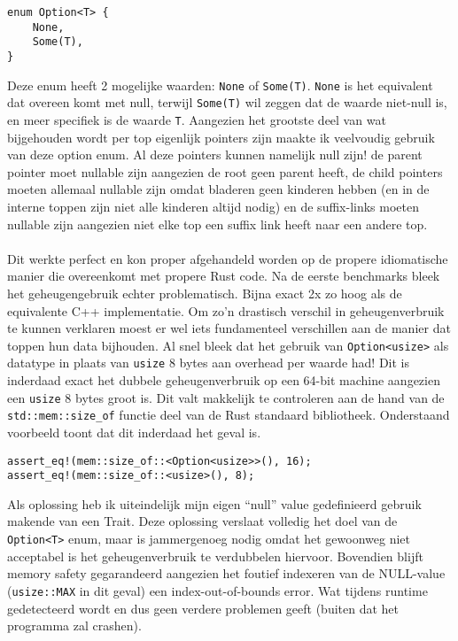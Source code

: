 \begin{verbatim}
enum Option<T> {
    None,
    Some(T),
}
\end{verbatim}

Deze enum heeft 2 mogelijke waarden: \texttt{None} of \texttt{Some(T)}.
\texttt{None} is het equivalent dat overeen komt met null, terwijl \texttt{Some(T)} wil zeggen dat de waarde niet-null is, en meer specifiek is de waarde \texttt{T}.
Aangezien het grootste deel van wat bijgehouden wordt per top eigenlijk pointers zijn maakte ik veelvoudig gebruik van deze option enum.
Al deze pointers kunnen namelijk null zijn!
de parent pointer moet nullable zijn aangezien de root geen parent heeft, de child pointers moeten allemaal nullable zijn omdat bladeren geen kinderen hebben (en in de interne toppen zijn niet alle kinderen altijd nodig) en de suffix-links moeten nullable zijn aangezien niet elke top een suffix link heeft naar een andere top.
\\ \\
Dit werkte perfect en kon proper afgehandeld worden op de propere idiomatische manier die overeenkomt met propere Rust code.
Na de eerste benchmarks bleek het geheugengebruik echter problematisch.
Bijna exact 2x zo hoog als de equivalente C++ implementatie.
Om zo'n drastisch verschil in geheugenverbruik te kunnen verklaren moest er wel iets fundamenteel verschillen aan de manier dat toppen hun data bijhouden.
Al snel bleek dat het gebruik van \texttt{Option<usize>} als datatype in plaats van \texttt{usize} 8 bytes aan overhead per waarde had!
Dit is inderdaad exact het dubbele geheugenverbruik op een 64-bit machine aangezien een \texttt{usize} 8 bytes groot is.
Dit valt makkelijk te controleren aan de hand van de \texttt{std::mem::size\_of} functie deel van de Rust standaard bibliotheek.
Onderstaand voorbeeld toont dat dit inderdaad het geval is.
\begin{verbatim}
assert_eq!(mem::size_of::<Option<usize>>(), 16);
assert_eq!(mem::size_of::<usize>(), 8);
\end{verbatim}

Als oplossing heb ik uiteindelijk mijn eigen ``null'' value gedefinieerd gebruik makende van een Trait.
Deze oplossing verslaat volledig het doel van de \texttt{Option<T>} enum, maar is jammergenoeg nodig omdat het gewoonweg niet acceptabel is het geheugenverbruik te verdubbelen hiervoor.
Bovendien blijft memory safety gegarandeerd aangezien het foutief indexeren van de NULL-value (\texttt{usize::MAX} in dit geval) een index-out-of-bounds error.
Wat tijdens runtime gedetecteerd wordt en dus geen verdere problemen geeft (buiten dat het programma zal crashen).

